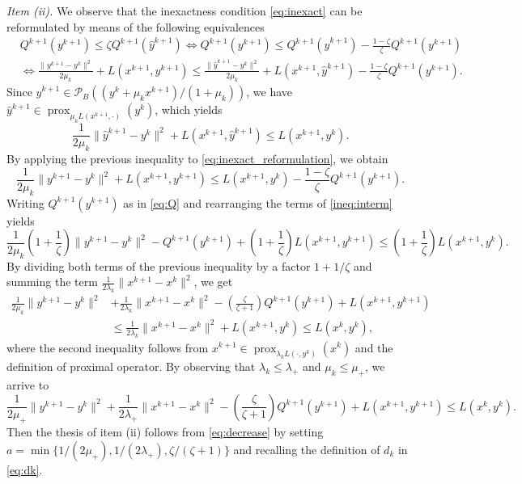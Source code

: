 \documentclass[pdflatex,sn-mathphys-num]{sn-jnl}
\numberwithin{equation}{section}%
\newcommand{\prox}{\operatorname{prox}}
\theoremstyle{thmstyleone}%
\theoremstyle{thmstyletwo}%
\theoremstyle{thmstylethree}%
\begin{document}
\begin{appendices}
{\it Item (ii).} We observe that the inexactness condition \eqref{eq:inexact} can be reformulated by means of the following equivalences
\begin{align}
    &Q^{k+1}(y^{k+1}) \le \zeta Q^{k+1}(\hat{y}^{k+1}) \Leftrightarrow  Q^{k+1}(y^{k+1}) \leq Q^{k+1}(\hat{y}^{k+1}) - \frac{1-\zeta}{\zeta} Q^{k+1}(y^{k+1})\nonumber\\
    & \Leftrightarrow  \frac{\|y^{k+1}-y^k\|^2}{2\mu_k}+L(x^{k+1},y^{k+1})\leq \frac{\|\hat{y}^{k+1}-y^k\|^2}{2\mu_k}+L(x^{k+1},\hat{y}^{k+1})- \frac{1-\zeta}{\zeta} Q^{k+1}(y^{k+1})\label{eq:inexact_reformulation}.
\end{align}
Since $\hat{y}^{k+1}\in\mathcal{P}_B((y^k+\mu_kx^{k+1})/(1+\mu_k))$, we have $\hat{y}^{k+1}\in \prox_{\mu_k L(x^{k+1},\cdot)}(y^k)$, which yields
\begin{equation}\label{eq:projB}
    \frac{1}{2\mu_k}\|\hat{y}^{k+1}-y^k\|^2+L(x^{k+1},\hat{y}^{k+1})\leq L(x^{k+1},y^k).
\end{equation}
By applying the previous inequality to \eqref{eq:inexact_reformulation}, we obtain
\begin{equation}\label{ineq:interm}
    \frac{1}{2\mu_k}\|y^{k+1}-y^k\|^2+L(x^{k+1},y^{k+1})\leq L(x^{k+1},y^k)- \frac{1-\zeta}{\zeta} Q^{k+1}(y^{k+1}).
\end{equation}
Writing $Q^{k+1}(y^{k+1})$ as in \eqref{eq:Q} and rearranging the terms  of \eqref{ineq:interm} yields
\begin{equation*}
    \frac{1}{2\mu_k}\left(1+\frac{1}{\zeta}\right)\|y^{k+1}-y^k\|^2-Q^{k+1}(y^{k+1})+\left(1+\frac{1}{\zeta}\right)L(x^{k+1},y^{k+1})\leq \left(1+\frac{1}{\zeta}\right)L(x^{k+1},y^k).
\end{equation*}
By dividing both terms of the previous inequality  by a factor $1+1/\zeta$ and summing the term $\frac{1}{2\lambda_k}\|x^{k+1}-x^k\|^2$, we get
\begin{align*}
    \frac{1}{2\mu_k}\|y^{k+1}-y^k\|^2&+\frac{1}{2\lambda_k}\|x^{k+1}-x^k\|^2-\left(\frac{\zeta}{\zeta+1}\right)Q^{k+1}(y^{k+1})+L(x^{k+1},y^{k+1})\\
    &\leq \frac{1}{2\lambda_k}\|x^{k+1}-x^k\|^2+L(x^{k+1},y^k)
    \leq L(x^k,y^k),
\end{align*}
where the second inequality follows from $x^{k+1}\in\prox_{\lambda_k L(\cdot,y^k)}(x^k)$ and the definition of proximal operator.
By observing that $\lambda_k\leq \lambda_+$ and $\mu_k\leq \mu_+$, we arrive to
\begin{equation}\label{eq:decrease}
    \frac{1}{2\mu_+}\|y^{k+1}-y^k\|^2+\frac{1}{2\lambda_+}\|x^{k+1}-x^k\|^2-\left(\frac{\zeta}{\zeta+1}\right)Q^{k+1}(y^{k+1})+L(x^{k+1},y^{k+1})\leq L(x^{k},y^k).
\end{equation}
Then the thesis of item (ii) follows from \eqref{eq:decrease} by setting $a=\min\{1/(2\mu_+),1/(2\lambda_{+}),\zeta/(\zeta+1)\}$ and recalling the definition of $d_k$ in \eqref{eq:dk}.


\end{appendices}
\end{document}
